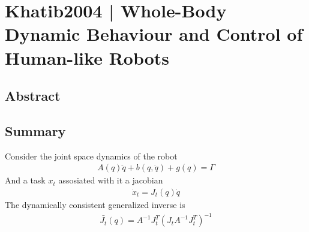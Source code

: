 \section{Khatib2004 | Whole-Body Dynamic Behaviour and Control of Human-like Robots}

\cite{khatib2004} 

\subsection{Abstract}

\subsection{Summary}

Consider the joint space dynamics of the robot
\begin{align}
    A(q)\ddot q + b(q, \dot q) + g(q) = \Gamma
\end{align}
And a task $x_t$ assosiated with it a jacobian
\begin{align}
    \dot x_t = J_t(q)\dot q
\end{align}
The dynamically consistent generalized inverse \cite{khatib1987} is
\begin{align}
    \bar{J_t}(q) = A^{-1} J_t^T (J_t A^{-1} J_t^T)^{-1}
\end{align}

